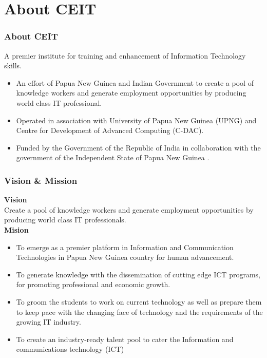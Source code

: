 \section{About CEIT}

\begin{frame}
\frametitle{About CEIT}
A premier institute for training and enhancement of Information Technology skills. \vspace{.4cm}
\begin{itemize}
    \item<1-> An effort of Papua New Guinea and Indian Government to create a pool of knowledge workers and generate employment opportunities by producing world class IT professional.
    \item<2-> Operated in association with University of Papua New Guinea (UPNG) and Centre for Development of Advanced Computing (C-DAC).
    \item<3-> Funded by the Government of the Republic of India in collaboration with the government of the Independent State of Papua New Guinea . 
\end{itemize}

\end{frame}


\begin{frame}
\frametitle{Vision \& Mission}
\textbf{Vision} \\
Create a pool of knowledge workers and generate employment opportunities by producing world class IT professionals.\\ \vspace{.4cm}
\textbf{Mision}
\begin{itemize}
    \item<1-> To emerge as a premier platform in Information and Communication Technologies in Papua New Guinea country for human advancement. 

    \item<2-> To generate knowledge with the dissemination of cutting edge ICT programs, for promoting professional and economic growth.

    \item<3-> To groom the students to work on current technology as well as prepare them to keep pace with the changing face of technology and the requirements of the growing IT industry.
    
    \item<4 -> To create an industry-ready talent pool to cater the Information and communications technology (ICT)
\end{itemize}

\end{frame}